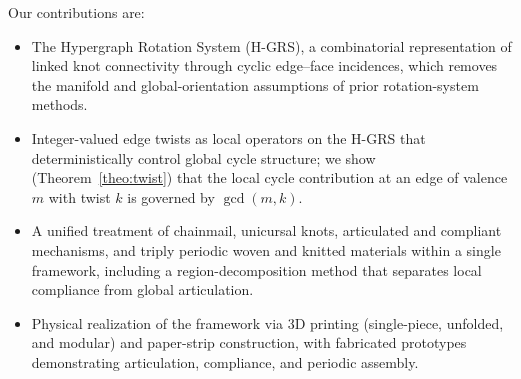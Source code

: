 \documentclass[acmtog]{acmart}
\begin{document}
Our contributions are:
\begin{itemize}
      \item The Hypergraph Rotation System (H-GRS), a combinatorial representation of linked knot connectivity through cyclic edge--face incidences, which removes the manifold and global-orientation assumptions of prior rotation-system methods.
      \item Integer-valued edge twists as local operators on the H-GRS that deterministically control global cycle structure; we show (Theorem~\ref{theo:twist}) that the local cycle contribution at an edge of valence $m$ with twist $k$ is governed by $\gcd(m,k)$.
      \item A unified treatment of chainmail, unicursal knots, articulated and compliant mechanisms, and triply periodic woven and knitted materials within a single framework, including a region-decomposition method that separates local compliance from global articulation.
      \item Physical realization of the framework via 3D printing (single-piece, unfolded, and modular) and paper-strip construction, with fabricated prototypes demonstrating articulation, compliance, and periodic assembly.
  \end{itemize}
\end{document}
